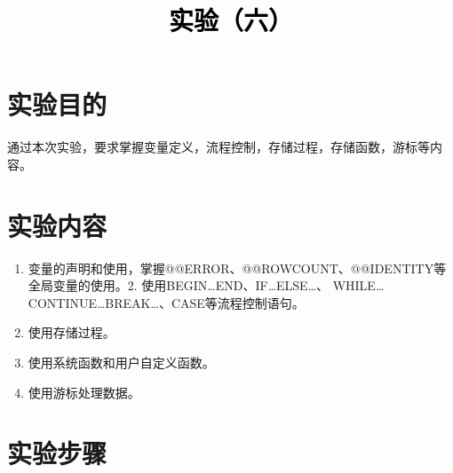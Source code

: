 \documentclass[a4paper,twoside]{article}
\newcommand{\PaperTitle}{实验（六）}  %
\begin{document}
\newpage

\title{
	\Large{\textcolor{black}{\PaperTitle}}
}
	
	
\maketitle
	
\tableofcontents
 
\newpage
\setcounter{page}{1}

\begin{spacing}{1.2}

\section{实验目的}
通过本次实验，要求掌握变量定义，流程控制，存储过程，存储函数，游标等内容。

\section{实验内容}
\begin{enumerate}
  \item 变量的声明和使用，掌握@@ERROR、@@ROWCOUNT、@@IDENTITY等全局变量的使用。2. 使用BEGIN…END、IF…ELSE…、 WHILE…CONTINUE…BREAK…、CASE等流程控制语句。
  \item 使用存储过程。
  \item 使用系统函数和用户自定义函数。
  \item 使用游标处理数据。
\end{enumerate}

\section{实验步骤}


\end{spacing}
\end{document}
